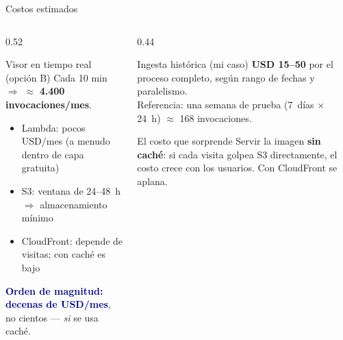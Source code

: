 \documentclass[10pt,aspectratio=169]{beamer}
\begin{document}
\begin{frame}{Costos estimados}
  \begin{columns}[T]
    \begin{column}{0.52\textwidth}
      \begin{block}{Visor en tiempo real (opción B)}
        \small
        Cada 10 min $\Rightarrow$ $\approx$ \textbf{4.400 invocaciones/mes}.
        \begin{itemize}\footnotesize
          \item Lambda: pocos USD/mes (a menudo dentro de capa gratuita)
          \item S3: ventana de 24--48~h $\Rightarrow$ almacenamiento mínimo
          \item CloudFront: depende de visitas; con caché es bajo
        \end{itemize}
        \vspace{0.2em}
        \textcolor{darkblue}{\textbf{Orden de magnitud: decenas de USD/mes}},
        no cientos --- \emph{si} se usa caché.
      \end{block}
    \end{column}
    \begin{column}{0.44\textwidth}
      \begin{block}{Ingesta histórica (mi caso)}
        \small
        \textbf{USD 15--50} por el proceso completo, según rango de fechas y
        paralelismo.\\[0.2em]
        \footnotesize
        Referencia: una semana de prueba (7~días $\times$ 24~h)
        $\approx$ 168 invocaciones.
      \end{block}
      \begin{alertblock}{El costo que sorprende}
        \small
        Servir la imagen \textbf{sin caché}: si cada visita golpea S3
        directamente, el costo crece con los usuarios. Con CloudFront se
        aplana.
      \end{alertblock}
    \end{column}
  \end{columns}
\end{frame}
\end{document}
